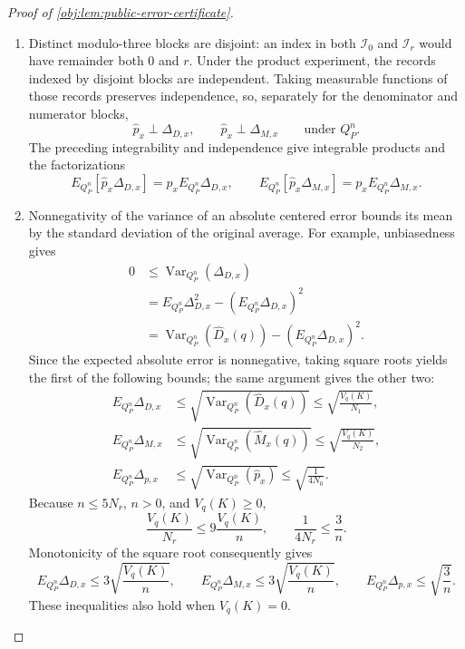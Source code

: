 \documentclass[11pt]{article}
\begin{document}
\begin{proof}[Proof of \cref{obj:lem:public-error-certificate}]
\begin{enumerate}
\item
Distinct modulo-three blocks are disjoint: an index in both
\(\mathcal I_0\) and \(\mathcal I_r\) would have remainder both \(0\) and
\(r\). Under the product experiment, the records indexed by disjoint
blocks are independent. Taking measurable functions of those records
preserves independence, so, separately for the denominator and numerator
blocks,
\[
\widehat p_x\perp\Delta_{D,x},
\qquad
\widehat p_x\perp\Delta_{M,x}
\qquad\text{under }Q_P^n.
\]
The preceding integrability and independence give integrable products and
the factorizations
\[
E_{Q_P^n}[\widehat p_x\Delta_{D,x}]
=p_xE_{Q_P^n}\Delta_{D,x},
\qquad
E_{Q_P^n}[\widehat p_x\Delta_{M,x}]
=p_xE_{Q_P^n}\Delta_{M,x}.
\]

\item
Nonnegativity of the variance of an absolute centered error bounds its
mean by the standard deviation of the original average. For example,
unbiasedness gives
\[
\begin{aligned}
0
&\le\operatorname{Var}_{Q_P^n}(\Delta_{D,x})\\
&=E_{Q_P^n}\Delta_{D,x}^2
  -(E_{Q_P^n}\Delta_{D,x})^2\\
&=\operatorname{Var}_{Q_P^n}(\widehat D_x(q))
  -(E_{Q_P^n}\Delta_{D,x})^2.
\end{aligned}
\]
Since the expected absolute error is nonnegative, taking square roots
yields the first of the following bounds; the same argument gives the
other two:
\[
\begin{aligned}
E_{Q_P^n}\Delta_{D,x}
&\le\sqrt{\operatorname{Var}_{Q_P^n}(\widehat D_x(q))}
\le\sqrt{\frac{V_q(K)}{N_1}},\\
E_{Q_P^n}\Delta_{M,x}
&\le\sqrt{\operatorname{Var}_{Q_P^n}(\widehat M_x(q))}
\le\sqrt{\frac{V_q(K)}{N_2}},\\
E_{Q_P^n}\Delta_{p,x}
&\le\sqrt{\operatorname{Var}_{Q_P^n}(\widehat p_x)}
\le\sqrt{\frac1{4N_0}}.
\end{aligned}
\]
Because \(n\le5N_r\), \(n>0\), and \(V_q(K)\ge0\),
\[
\frac{V_q(K)}{N_r}\le9\frac{V_q(K)}{n},
\qquad
\frac1{4N_r}\le\frac3n.
\]
Monotonicity of the square root consequently gives
\[
E_{Q_P^n}\Delta_{D,x}\le3\sqrt{\frac{V_q(K)}{n}},
\qquad
E_{Q_P^n}\Delta_{M,x}\le3\sqrt{\frac{V_q(K)}{n}},
\qquad
E_{Q_P^n}\Delta_{p,x}\le\sqrt{\frac3n}.
\]
These inequalities also hold when \(V_q(K)=0\).


\end{enumerate}
\end{proof}
\end{document}
